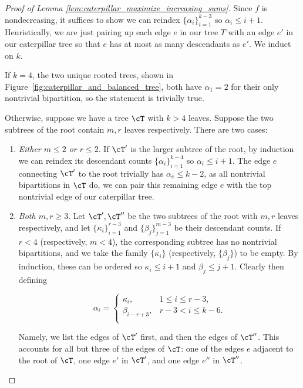 \begin{proof}[Proof of Lemma \ref{lem:caterpillar_maximize_increasing_sums}]
    Since $f$ is nondecreasing, it suffices to show we can reindex $\{\alpha_i\}_{i=1}^{k-3}$ so
    $\alpha_i \leq i + 1$. Heuristically, we are just pairing up each edge $e$ in our
    tree $T$ with an edge $e'$ in our caterpillar tree so that $e$ has at most as many descendants as $e'$.
    We induct on $k$.

    If $k=4$, the two unique rooted trees, shown in Figure~\ref{fig:caterpillar_and_balanced_tree},
    both have $\alpha_1 = 2$ for their only nontrivial bipartition, so the
    statement is trivially true.

    Otherwise, suppose we have a tree $\cT$ with $k > 4$ leaves. Suppose the two subtrees of the root contain
    $m,r$ leaves respectively. There are two cases:

    \begin{enumerate}[label=(\alph*)]
        \item \textit{Either $m \leq 2$ or $r \leq 2$}. If $\cT'$ is the larger subtree of the root, by induction we can reindex
        its descendant counts $\{\alpha_i\}_{i=1}^{k-4}$ so $\alpha_i \leq i+1$. The edge $e$ connecting $\cT'$ to the root
        trivially has $\alpha_e \leq k-2$, as all nontrivial bipartitions in $\cT$ do, we can pair this remaining edge $e$ with
        the top nontrivial edge of our caterpillar tree.

        \item \textit{Both $m, r \geq 3$}. Let $\cT', \cT''$ be the two subtrees of
               the root with $m,r$ leaves respectively, and
               let $\{\kappa_i\}_{i=1}^{r-3}$ and $\{\beta_j\}_{j=1}^{m-3}$ be their descendant
               counts. If $r<4$ (respectively, $m<4$), the corresponding subtree has no nontrivial
               bipartitions, and we take the family $\{\kappa_i\}$ (respectively, $\{\beta_j\}$) to be empty.
               By induction, these can be ordered so $\kappa_i \leq i+1$ and $\beta_j \leq j+1$.
               Clearly then defining

        \[\alpha_i = \begin{cases}
            \kappa_i, & 1 \leq i \leq r-3, \\
            \beta_{i-r+3}, & r-3 < i  \leq k-6. \\
        \end{cases}\]

        \noindent Namely, we list the edges of $\cT'$ first, and then the edges of $\cT''$. This accounts
        for all but three of the edges of $\cT$: one of the edges $e$ adjacent to the root of $\cT$, one edge $e'$ in $\cT'$,
        and one edge $e''$ in $\cT''$.


\end{enumerate}
\end{proof}
